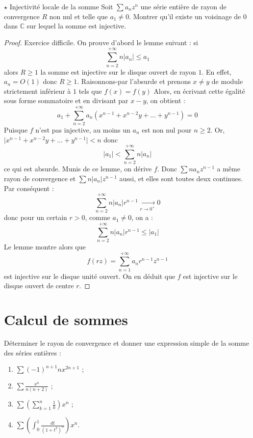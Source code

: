 \documentclass[french,a4paper]{article}
\newcommand{\C}{\mathbb{C}}
\theoremstyle{plain}
\theoremstyle{definition}
\theoremstyle{remark}
\begin{document}
\begin{ex}[Moulin.SE.13]{$\star$ Injectivité locale de la somme}
	Soit $\sum a_nz^n$ une série entière de rayon de convergence $R$ non nul et telle que $a_1\ne 0$. Montrer qu'il existe un voisinage de $0$ dans $\C$ sur lequel la somme est injective.
\end{ex}
\begin{proof}
	Exercice difficile. On prouve d'abord le lemme suivant : si $$\sum_{n=2}^{+\infty}n\lvert a_n\rvert\leqslant a_1$$ alors $R\geqslant 1$ la somme est injective sur le disque ouvert de rayon $1$. En effet, $a_n=O(1)$ donc $R\geqslant 1$. Raisonnons-par l'absurde et prenons $x\ne y$ de module strictement inférieur à $1$ tels que $f(x)=f(y)$ Alors, en écrivant cette égalité sous forme sommatoire et en divisant par $x-y$, on obtient : $$a_1+\sum_{n=2}^{+\infty}a_n(x^{n-1}+x^{n-2}y+\ldots+y^{n-1})=0$$ Puisque $f$ n'est pas injective, au moins un $a_n$ est non nul pour $n\geqslant 2$. Or, $\lvert x^{n-1}+x^{n-2}y+\ldots+y^{n-1}\rvert<n$ donc $$\lvert a_1\rvert <\sum_{n=2}^{+\infty}n\lvert a_n\rvert$$ ce qui est absurde. Munis de ce lemme, on dérive $f$. Donc $\sum na_nz^{n-1}$ a même rayon de convergence et $\sum n\lvert a_n\rvert z^{n-1}$ aussi, et elles sont toutes deux continues. Par conséquent : $$\sum_{n=2}^{+\infty}n\lvert a_n\rvert r^{n-1}\xrightarrow[r\to 0^+]{}0$$ donc pour un certain $r>0$, comme $a_1\ne 0$, on a : $$\sum_{n=2}^{+\infty}n\lvert a_n\rvert r^{n-1}\leqslant \lvert a_1\rvert$$ Le lemme montre alors que $$f(rz)=\sum_{n=1}^{+\infty}a_nr^{n-1}z^{n-1}$$ est injective sur le disque unité ouvert. On en déduit que $f$ est injective sur le disque ouvert de centre $r$.
\end{proof}

\section{Calcul de sommes}

\begin{ex}[Moulin.SE.14]{}
	Déterminer le rayon de convergence et donner une expression simple de la somme des séries entières :
	\begin{enumerate}
		\item $\displaystyle\sum(-1)^{n+1}nx^{2n+1}$ ;
		\item $\displaystyle\sum \frac{x^n}{n(n+2)}$ ;
		\item $\displaystyle\sum\left(\sum_{k=1}^{n}\frac{1}{k}\right)x^n$ ;
		\item $\displaystyle\sum\left(\int_{0}^{1}\frac{dt}{(1+t^2)^n}\right)x^n$.
	\end{enumerate}
\end{ex}
\end{document}
